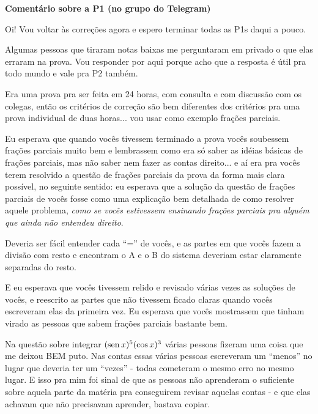 \documentclass[oneside,12pt]{article}
\begin{document}
\newpage


{\bf Comentário sobre a P1 (no grupo do Telegram)}

\ssk

Oi! Vou voltar às correções agora e espero terminar todas as P1s daqui
a pouco.

Algumas pessoas que tiraram notas baixas me perguntaram em privado o
que elas erraram na prova. Vou responder por aqui porque acho que a
resposta é útil pra todo mundo e vale pra P2 também.

Era uma prova pra ser feita em 24 horas, com consulta e com discussão
com os colegas, então os critérios de correção são bem diferentes dos
critérios pra uma prova individual de duas horas... vou usar como
exemplo frações parciais.

Eu esperava que quando vocês tivessem terminado a prova vocês
soubessem frações parciais muito bem e lembrassem como era só saber as
idéias básicas de frações parciais, mas não saber nem fazer as contas
direito... e aí era pra vocês terem resolvido a questão de frações
parciais da prova da forma mais clara possível, no seguinte sentido:
eu esperava que a solução da questão de frações parciais de vocês
fosse como uma explicação bem detalhada de como resolver aquele
problema, {\it como se vocês estivessem ensinando frações parciais pra
  alguém que ainda não entendeu direito}.

Deveria ser fácil entender cada ``='' de vocês, e as partes em que vocês
fazem a divisão com resto e encontram o A e o B do sistema deveriam
estar claramente separadas do resto.

E eu esperava que vocês tivessem relido e revisado várias vezes as
soluções de vocês, e reescrito as partes que não tivessem ficado
claras quando vocês escreveram elas da primeira vez. Eu esperava que
vocês mostrassem que tinham virado as pessoas que sabem frações
parciais bastante bem.

Na questão sobre integrar $(\operatorname{sen} x)^5 (\cos x)^3$ várias pessoas
fizeram uma coisa que me deixou BEM puto. Nas contas essas várias
pessoas escreveram um ``menos'' no lugar que deveria ter um ``vezes''
- todas cometeram o mesmo erro no mesmo lugar. E isso pra mim foi
sinal de que as pessoas não aprenderam o suficiente sobre aquela parte
da matéria pra conseguirem revisar aquelas contas - e que elas achavam
que não precisavam aprender, bastava copiar.
\end{document}
